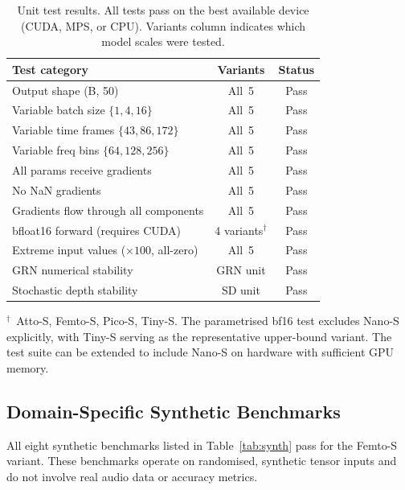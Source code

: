 \documentclass{article}
\newcommand{\passmark}{\textnormal{Pass}}
\begin{document}
\begin{table}[h]
  \centering
  \caption{Unit test results. All tests pass on the best available device
  (CUDA, MPS, or CPU). Variants column indicates which model scales were
  tested.}
  \label{tab:unit_tests}
  \small
  \begin{tabular}{lcc}
  \toprule
  \textbf{Test category} & \textbf{Variants} & \textbf{Status} \\
  \midrule
  Output shape (B, 50) & All~5 & \passmark \\
  Variable batch size $\{1, 4, 16\}$ & All~5 & \passmark \\
  Variable time frames $\{43, 86, 172\}$ & All~5 & \passmark \\
  Variable freq bins $\{64, 128, 256\}$ & All~5 & \passmark \\
  All params receive gradients & All~5 & \passmark \\
  No NaN gradients & All~5 & \passmark \\
  Gradients flow through all components & All~5 & \passmark \\
  bfloat16 forward (requires CUDA) & 4 variants$^\dagger$ & \passmark \\
  Extreme input values ($\times 100$, all-zero) & All~5 & \passmark \\
  GRN numerical stability & GRN unit & \passmark \\
  Stochastic depth stability & SD unit & \passmark \\
  \bottomrule
  \end{tabular}

  \vspace{4pt}
  $^\dagger$\ Atto-S, Femto-S, Pico-S, Tiny-S. The parametrised bf16 test
  excludes Nano-S explicitly, with Tiny-S serving as the representative
  upper-bound variant. The test suite can be extended to include Nano-S on
  hardware with sufficient GPU memory.
\end{table}

\subsection{Domain-Specific Synthetic Benchmarks}

All eight synthetic benchmarks listed in Table~\ref{tab:synth} pass for the
Femto-S variant. These benchmarks operate on randomised, synthetic tensor
inputs and do not involve real audio data or accuracy metrics.
\end{document}
